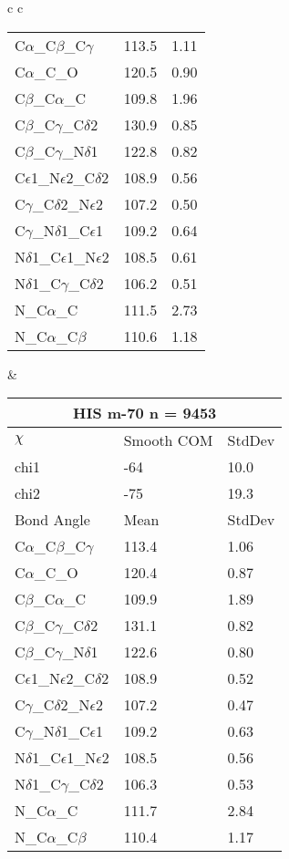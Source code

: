 \begin{longtable}{ c c }
\begin{tabular}{ l l l }
  C$\alpha$\_C$\beta$\_C$\gamma$ & 113.5 & 1.11\\
  C$\alpha$\_C\_O & 120.5 & 0.90\\
  C$\beta$\_C$\alpha$\_C & 109.8 & 1.96\\
  C$\beta$\_C$\gamma$\_C$\delta$2 & 130.9 & 0.85\\
  C$\beta$\_C$\gamma$\_N$\delta$1 & 122.8 & 0.82\\
  C$\epsilon$1\_N$\epsilon$2\_C$\delta$2 & 108.9 & 0.56\\
  C$\gamma$\_C$\delta$2\_N$\epsilon$2 & 107.2 & 0.50\\
  C$\gamma$\_N$\delta$1\_C$\epsilon$1 & 109.2 & 0.64\\
  N$\delta$1\_C$\epsilon$1\_N$\epsilon$2 & 108.5 & 0.61\\
  N$\delta$1\_C$\gamma$\_C$\delta$2 & 106.2 & 0.51\\
  N\_C$\alpha$\_C & 111.5 & 2.73\\
  N\_C$\alpha$\_C$\beta$ & 110.6 & 1.18\\
  \bottomrule
  \end{tabular}
  &
  \begin{tabular}{ l l l }
  \toprule
  \multicolumn{3}{c}{HIS \textbf{m-70} n = 9453} \\ \toprule
  $\chi$       & Smooth COM & StdDev \\ \midrule
  chi1 & -64 & 10.0 \\ 
  chi2 & -75 & 19.3 \\ \midrule
  Bond Angle   & Mean     & StdDev \\ \midrule
  C$\alpha$\_C$\beta$\_C$\gamma$ & 113.4 & 1.06\\
  C$\alpha$\_C\_O & 120.4 & 0.87\\
  C$\beta$\_C$\alpha$\_C & 109.9 & 1.89\\
  C$\beta$\_C$\gamma$\_C$\delta$2 & 131.1 & 0.82\\
  C$\beta$\_C$\gamma$\_N$\delta$1 & 122.6 & 0.80\\
  C$\epsilon$1\_N$\epsilon$2\_C$\delta$2 & 108.9 & 0.52\\
  C$\gamma$\_C$\delta$2\_N$\epsilon$2 & 107.2 & 0.47\\
  C$\gamma$\_N$\delta$1\_C$\epsilon$1 & 109.2 & 0.63\\
  N$\delta$1\_C$\epsilon$1\_N$\epsilon$2 & 108.5 & 0.56\\
  N$\delta$1\_C$\gamma$\_C$\delta$2 & 106.3 & 0.53\\
  N\_C$\alpha$\_C & 111.7 & 2.84\\
  N\_C$\alpha$\_C$\beta$ & 110.4 & 1.17\\
  \bottomrule
  \end{tabular}
  \\
  
\end{longtable}

